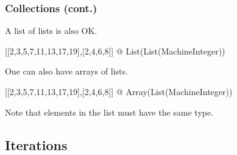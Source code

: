 \begin{frame}[fragile]
  \frametitle<presentation>{Collections (cont.)}

A list of lists is also OK.
\begin{myverbatim}
[[2,3,5,7,11,13,17,19],[2,4,6,8]] @ List(List(MachineInteger))
\end{myverbatim}
One can also have arrays of lists.
\begin{myverbatim}
[[2,3,5,7,11,13,17,19],[2,4,6,8]] @ Array(List(MachineInteger))
\end{myverbatim}
Note that elements in the list must have the same type.
\end{frame}
\begin{myverbatim}
\end{myverbatim}
\begin{comment}
<<Collections>>=
aldor -gloop
macro I == MachineInteger;
import from I, List I;
u1 := [2,3,5,7,11,13,17,19]
u2 := [2*i for i in 1..4]
u3 := [2*i for i in 9 .. -9 by -2]
u4 := [5*i for i in 20 .. -20 by -3 | bit?(i,2)]
[3*i for i in u1 | not(i=11)]
[u3.(2*i) for i in 1..3]
[a+b for a in [1, 4, 0] for b in [2,5,7,9,11]]
v1: List List I := [u1,u2]
a1: Array List I := [u1,u2]
#quit
@
\end{comment}

















\subsection{Iterations}
\begin{myverbatim}
\end{myverbatim}

